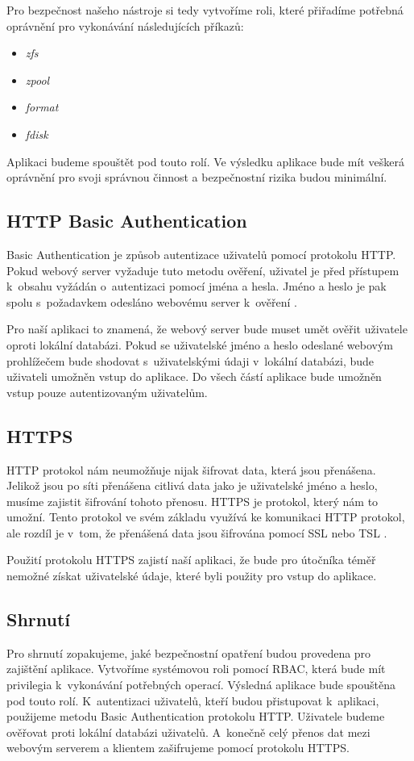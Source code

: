     Pro bezpečnost našeho nástroje si tedy vytvoříme roli, které přiřadíme potřebná oprávnění pro vykonávání následujících příkazů:
    \begin{itemize}
      \item \emph{zfs}
      \item \emph{zpool}
      \item \emph{format}
      \item \emph{fdisk}
    \end{itemize}

    Aplikaci budeme spouštět pod touto rolí. Ve výsledku aplikace bude mít veškerá oprávnění pro svoji správnou činnost a bezpečnostní rizika budou minimální.
    \subsection{HTTP Basic Authentication}
    \label{httpauth}
    Basic Authentication je způsob autentizace uživatelů pomocí protokolu HTTP. Pokud webový server vyžaduje tuto metodu ověření, uživatel je před přístupem k~obsahu vyžádán o~autentizaci pomocí jména a hesla. Jméno a heslo je pak spolu s~požadavkem odesláno webovému server k~ověření \cite{RFC2617}.

    Pro naší aplikaci to znamená, že webový server bude muset umět ověřit uživatele oproti lokální databázi. Pokud se uživatelské jméno a heslo odeslané webovým prohlížečem bude shodovat s~uživatelskými údaji v~lokální databázi, bude uživateli umožněn vstup do aplikace. Do všech částí aplikace bude umožněn vstup pouze autentizovaným uživatelům.

    \subsection{HTTPS}
    \label{https}
    HTTP protokol nám neumožňuje nijak šifrovat data, která jsou přenášena. Jelikož jsou po síti přenášena citlivá data jako je uživatelské jméno a heslo, musíme zajistit šifrování tohoto přenosu. HTTPS je protokol, který nám to umožní. Tento protokol ve svém základu využívá ke komunikaci HTTP protokol, ale rozdíl je v~tom, že přenášená data jsou šifrována pomocí SSL nebo TSL \cite{RFC2818}.

    Použití protokolu HTTPS zajistí naší aplikaci, že bude pro útočníka téměř nemožné získat uživatelské údaje, které byli použity pro vstup do aplikace.
    \subsection{Shrnutí}
    Pro shrnutí zopakujeme, jaké bezpečnostní opatření budou provedena pro zajištění aplikace. Vytvoříme systémovou roli pomocí RBAC, která bude mít privilegia k~vykonávání potřebných operací. Výsledná aplikace bude spouštěna pod touto rolí. K~autentizaci uživatelů, kteří budou přistupovat k~aplikaci, použijeme metodu Basic Authentication protokolu HTTP. Uživatele budeme ověřovat proti lokální databázi uživatelů. A~konečně celý přenos dat mezi webovým serverem a klientem zašifrujeme pomocí protokolu HTTPS.

